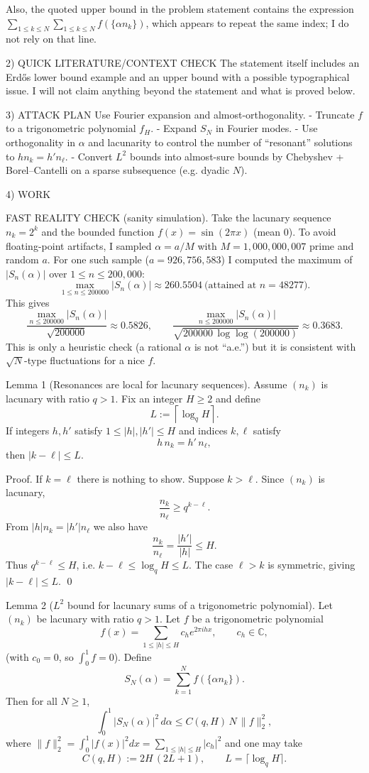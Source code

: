 Also, the quoted upper bound in the problem statement contains the expression $\sum_{1\le k\le N}\sum_{1\le k\le N}f(\{\alpha n_k\})$, which appears to repeat the same index; I do not rely on that line.

2) QUICK LITERATURE/CONTEXT CHECK
The statement itself includes an Erd\H{o}s lower bound example and an upper bound with a possible typographical issue.  I will not claim anything beyond the statement and what is proved below.

3) ATTACK PLAN
Use Fourier expansion and almost-orthogonality.
- Truncate $f$ to a trigonometric polynomial $f_H$.
- Expand $S_N$ in Fourier modes.
- Use orthogonality in $\alpha$ and lacunarity to control the number of ``resonant'' solutions to $h n_k = h' n_\ell$.
- Convert $L^2$ bounds into almost-sure bounds by Chebyshev + Borel--Cantelli on a sparse subsequence (e.g. dyadic $N$).

4) WORK

FAST REALITY CHECK (sanity simulation).
Take the lacunary sequence $n_k=2^k$ and the bounded function $f(x)=\sin(2\pi x)$ (mean $0$).  To avoid floating-point artifacts, I sampled $\alpha=a/M$ with $M=1{,}000{,}000{,}007$ prime and random $a$.
For one such sample ($a=926{,}756{,}583$) I computed the maximum of $|S_n(\alpha)|$ over $1\le n\le 200{,}000$:
\[
\max_{1\le n\le 200000}|S_n(\alpha)|\approx 260.5504\ \text{(attained at }n=48277\text{)}.
\]
This gives
\[
\frac{\max_{n\le 200000}|S_n(\alpha)|}{\sqrt{200000}}\approx 0.5826,
\qquad
\frac{\max_{n\le 200000}|S_n(\alpha)|}{\sqrt{200000\,\log\log(200000)}}\approx 0.3683.
\]
This is only a heuristic check (a rational $\alpha$ is not ``a.e.'') but it is consistent with $\sqrt{N}$-type fluctuations for a nice $f$.

Lemma 1 (Resonances are local for lacunary sequences).
Assume $(n_k)$ is lacunary with ratio $q>1$.  Fix an integer $H\ge 2$ and define
\[
L:=\left\lceil \log_q H\right\rceil.
\]
If integers $h,h'$ satisfy $1\le |h|,|h'|\le H$ and indices $k,\ell$ satisfy
\[
 h\,n_k = h'\,n_\ell,
\]
then $|k-\ell|\le L$.

Proof.
If $k=\ell$ there is nothing to show.  Suppose $k>\ell$.  Since $(n_k)$ is lacunary,
\[
\frac{n_k}{n_\ell} \ge q^{k-\ell}.
\]
From $|h|n_k=|h'|n_\ell$ we also have
\[
\frac{n_k}{n_\ell} = \frac{|h'|}{|h|} \le H.
\]
Thus $q^{k-\ell}\le H$, i.e. $k-\ell\le \log_q H\le L$.  The case $\ell>k$ is symmetric, giving $|k-\ell|\le L$. \qed

Lemma 2 ($L^2$ bound for lacunary sums of a trigonometric polynomial).
Let $(n_k)$ be lacunary with ratio $q>1$.  Let $f$ be a trigonometric polynomial
\[
 f(x)=\sum_{1\le |h|\le H} c_h e^{2\pi i h x},\qquad c_h\in\mathbb{C},
\]
(with $c_0=0$, so $\int_0^1 f=0$).  Define
\[
 S_N(\alpha)=\sum_{k=1}^N f(\{\alpha n_k\}).
\]
Then for all $N\ge 1$,
\[
\int_0^1 |S_N(\alpha)|^2\,d\alpha \le C(q,H)\, N\,\|f\|_2^2,
\]
where $\|f\|_2^2=\int_0^1 |f(x)|^2dx=\sum_{1\le |h|\le H}|c_h|^2$ and one may take
\[
 C(q,H):=2H\,(2L+1),\qquad L=\lceil \log_q H\rceil.
\]


